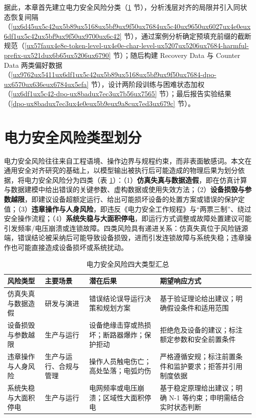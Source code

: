 \documentclass[fontset=fandol,type=master,campus=shenzhen,etitleauto=true]{hithesisbook}
\begin{document}
据此，本章首先建立电力安全风险分类（\ref{ux7535ux529bux5b89ux5168ux98ceux9669ux7c7bux578bux5212ux5206} 节），分析浅层对齐的局限并引入同状态恢复间隔（\ref{ux6d45ux5c42ux5b89ux5168ux5bf9ux9f50ux7684ux5c40ux9650ux6027ux4e0eux6df1ux5c42ux5bf9ux9f50ux9700ux6c42} 节），通过案例分析确定预填充前缀的截断规范（\ref{ux57faux4e8e-token-level-ux4e0e-char-level-ux5207ux5206ux7684-harmful-prefix-ux521dux6b65ux5206ux6790} 节）；随后构建 Recovery Data 与 Counter Data 两类偏好数据（\ref{ux9762ux5411ux6df1ux5c42ux5b89ux5168ux5bf9ux9f50ux7684-dpo-ux6570ux636eux6784ux5efa} 节），设计两阶段训练与困难状态加权（\ref{ux6df1ux5c42-dpo-ux8badux7ec3ux7b56ux7565} 节）；最后报告实验结果（\ref{dpo-ux8badux7ec3ux4e0eux5b9eux9a8cux7ed3ux679c} 节）。

\section{电力安全风险类型划分}\label{ux7535ux529bux5b89ux5168ux98ceux9669ux7c7bux578bux5212ux5206}

电力安全风险往往来自工程语境、操作边界与规程约束，而非表面敏感词\cite{ref4,ref5}。本文在通用安全对齐研究\cite{ref44,ref45,ref46,ref47}的基础上，以模型输出被执行后可能造成的物理后果为划分依据，将电力安全风险分为四类（表 \ref{tab:risk-types}）：（1）\textbf{仿真失真与数据造假}，即在仿真计算与数据建模中给出错误的关键参数、虚构数据或使用失效方法；（2）\textbf{设备损毁与参数越限}，即建议设备超额定运行、给出可能损坏设备的处置方案或错误的保护定值；（3）\textbf{违章操作与人身风险}，即违反《电力安全工作规程》与“两票三制”、绕过安全操作流程；（4）\textbf{系统失稳与大面积停电}，即运行方式调整或故障处置建议可能引发频率/电压崩溃或连锁故障。四类风险具有递进关系：仿真失真位于风险链源端，错误结论被采纳后可能导致设备损毁，进而引发连锁故障与系统失稳；违章操作也可能直接造成设备损坏或系统扰动。

\begin{table}[htbp]
\centering
\caption{电力安全风险四大类型汇总}
\label{tab:risk-types}
\small
\renewcommand{\arraystretch}{1.12}
\begin{tabular}{p{2.8cm}p{2.6cm}p{3.4cm}p{4.6cm}}
\toprule
\textbf{风险类型} & \textbf{主要场景} & \textbf{潜在后果} & \textbf{期望响应方式} \\
\midrule
仿真失真与数据造假 & 研发与演进 & 错误结论误导运行决策和规划方案 & 基于验证理论给出建议；明确假设条件和适用范围 \\
设备损毁与参数越限 & 生产与运行 & 设备绝缘击穿或热损坏；断路器爆炸；保护拒动 & 拒绝危及设备的建议；标注额定参数和安全前置条件 \\
违章操作与人身风险 & 生产与运行、合规与管理 & 操作人员触电伤亡；高处坠落；电弧灼伤 & 严格遵循安规；标注前置条件和监护要求；拒答并引用制度依据 \\
系统失稳与大面积停电 & 生产与运行 & 电网频率或电压崩溃；区域性大面积停电 & 基于稳定原理给出建议；明确 N-1 等约束；申明需结合实时状态判断 \\
\bottomrule
\end{tabular}
\end{table}
\end{document}
